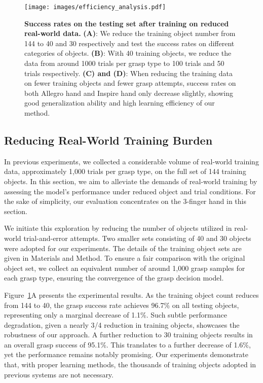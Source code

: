 \begin{figure}[t]
    \centering
    \texttt{[image: images/efficiency\_analysis.pdf]}
    \caption{\textbf{Success rates on the testing set after training on reduced real-world data.} \textbf{(A)}: We reduce the training object number from 144 to 40 and 30 respectively and test the success rates on different categories of objects. \textbf{(B)}:  With 40 training objects, we reduce the data from around 1000 trials per grasp type to 100 trials and 50 trials respectively. \textbf{(C) and (D)}: When reducing the training data on fewer training objects and fewer grasp attempts, success rates on both Allegro hand and Inspire hand only decrease slightly, showing good generalization ability and high learning efficiency of our method.}
    \label{fig:efficiency}
\end{figure}

\subsection{Reducing Real-World Training Burden}
In previous experiments, we collected a considerable volume of real-world training data, approximately 1,000 trials per grasp type, on the full set of 144 training objects. In this section, we aim to alleviate the demands of real-world training by assessing the model's performance under reduced object and trial conditions. For the sake of simplicity, our evaluation concentrates on the 3-finger hand in this section.

We initiate this exploration by reducing the number of objects utilized in real-world trial-and-error attempts. Two smaller sets consisting of 40 and 30 objects were adopted for our experiments. The details of the training object sets are given in Materials and Method. To ensure a fair comparison with the original object set, we collect an equivalent number of around 1,000 grasp samples for each grasp type, ensuring the convergence of the grasp decision model.

Figure~\ref{fig:efficiency}A presents the experimental results. As the training object count reduces from 144 to 40, the grasp success rate achieves 96.7\% on all testing objects, representing only a marginal decrease of 1.1\%. Such subtle performance degradation, given a nearly 3/4 reduction in training objects, showcases the robustness of our approach.  A further reduction to 30 training objects results in an overall grasp success of 95.1\%. This translates to a further decrease of 1.6\%, yet the performance remains notably promising. Our experiments demonstrate that, with proper learning methods, the thousands of training objects adopted in previous systems\cite{dexnet4, wang2023dexgraspnet} are not necessary. 



